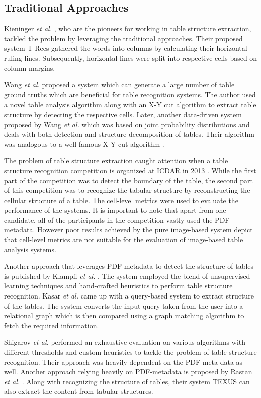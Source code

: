 \documentclass{ieeeaccess}
\begin{document}
\subsection{Traditional Approaches}
Kieninger \textit{et al.} \cite{b11,b12,b13}, who are the pioneers for working in table structure extraction, tackled the problem by leveraging the traditional approaches. Their proposed system T-Recs gathered the words into columns by calculating their horizontal ruling lines. Subsequently, horizontal lines were split into respective cells based on column margins.

Wang \textit{et al.} \cite{b15} proposed a system which can generate a large number of table ground truths which are beneficial for table recognition systems. The author used a novel table analysis algorithm along with an X-Y cut algorithm to extract table structure by detecting the respective cells. Later, another data-driven system proposed by Wang \textit{et al.} \cite{b16} which was based on joint probability distributions and deals with both detection and structure decomposition of tables. Their algorithm was analogous to a well famous X-Y cut algorithm \cite{b17}.

The problem of table structure extraction caught attention when a table structure recognition competition is organized at ICDAR in 2013 \cite{b18}. While the first part of the competition was to detect the boundary of the table, the second part of this competition was to recognize the tabular structure by reconstructing the cellular structure of a table. The cell-level metrics were used to evaluate the performance of the systems. It is important to note that apart from one candidate, all of the participants in the competition vastly used the PDF metadata. However poor results achieved by the pure image-based system depict that cell-level metrics are not suitable for the evaluation of image-based table analysis systems.

Another approach that leverages PDF-metadata to detect the structure of tables is published by Klampfl \textit{et al.} \cite{b19}. The system employed the blend of unsupervised learning techniques and hand-crafted heuristics to perform table structure recognition. Kasar \textit{et al.} \cite{b20} came up with a query-based system to extract structure of the tables. The system converts the input query taken from the user into a relational graph which is then compared using a graph matching algorithm to fetch the required information.

Shigarov \textit{et al.} \cite{b21} performed an exhaustive evaluation on various algorithms with different thresholds and custom heuristics to tackle the problem of table structure recognition. Their approach was heavily dependent on the PDF meta-data as well. Another approach relying heavily on PDF-metadata is proposed by Rastan \textit{et al.} \cite{b22}. Along with recognizing the structure of tables, their system TEXUS can also extract the content from tabular structures.
\end{document}

